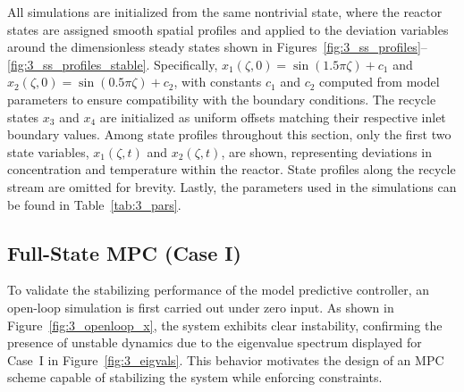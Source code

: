 All simulations are initialized from the same nontrivial state, where the reactor states are assigned smooth spatial profiles and applied to the deviation variables around the dimensionless steady states shown in Figures~\ref{fig:3_ss_profiles}--\ref{fig:3_ss_profiles_stable}. Specifically, $x_1(\zeta, 0) = \sin(1.5\pi \zeta) + c_1$ and $x_2(\zeta, 0) = \sin(0.5\pi \zeta) + c_2$, with constants $c_1$ and $c_2$ computed from model parameters to ensure compatibility with the boundary conditions. The recycle states $x_3$ and $x_4$ are initialized as uniform offsets matching their respective inlet boundary values. Among state profiles throughout this section, only the first two state variables, $x_1(\zeta, t)$ and $x_2(\zeta, t)$, are shown, representing deviations in concentration and temperature within the reactor. State profiles along the recycle stream are omitted for brevity. Lastly, the parameters used in the simulations can be found in Table~\ref{tab:3_pars}.


\subsection{Full-State MPC (Case I)}

To validate the stabilizing performance of the model predictive controller, an open-loop simulation is first carried out under zero input. As shown in Figure~\ref{fig:3_openloop_x}, the system exhibits clear instability, confirming the presence of unstable dynamics due to the eigenvalue spectrum displayed for Case~I in Figure~\ref{fig:3_eigvals}. This behavior motivates the design of an MPC scheme capable of stabilizing the system while enforcing constraints.

